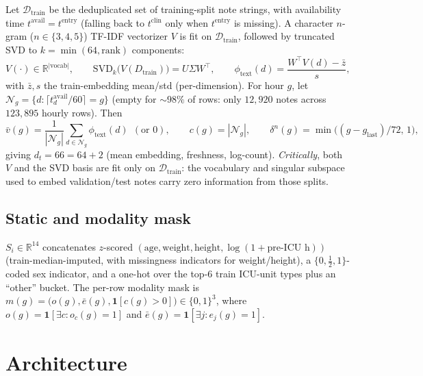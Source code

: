\documentclass[11pt]{article}
\newcommand{\R}{\mathbb{R}}
\newcommand{\1}[1]{\mathbf{1}\!\left[#1\right]}
\begin{document}
Let $\mathcal{D}_{\mathrm{train}}$ be the deduplicated set of training-split note strings, with availability time $t^{\mathrm{avail}} = t^{\mathrm{entry}}$ (falling back to $t^{\mathrm{clin}}$ only when $t^{\mathrm{entry}}$ is missing). A character $n$-gram ($n\in\{3,4,5\}$) TF-IDF vectorizer $V$ is fit on $\mathcal{D}_{\mathrm{train}}$, followed by truncated SVD to $k=\min(64,\mathrm{rank})$ components:
\begin{equation}
V(\cdot) \in \R^{|\mathrm{vocab}|}, \qquad \mathrm{SVD}_k\big(V(D_{\mathrm{train}})\big) = U\Sigma W^\top,\qquad \phi_{\mathrm{text}}(d) = \frac{W^\top V(d) - \bar z}{s},
\end{equation}
with $\bar z, s$ the train-embedding mean/std (per-dimension). For hour $g$, let $\mathcal{N}_g = \{d : \lceil t^{\mathrm{avail}}_d/60\rceil = g\}$ (empty for $\sim98\%$ of rows: only $12{,}920$ notes across $123{,}895$ hourly rows). Then
\begin{equation}
\bar v(g) = \frac{1}{|\mathcal{N}_g|}\sum_{d\in\mathcal{N}_g} \phi_{\mathrm{text}}(d) \ \ (\text{or } 0),\qquad c(g) = |\mathcal{N}_g|,\qquad
\delta^n(g) = \min\big((g - g_{\mathrm{last}})/72,\,1\big),
\end{equation}
giving $d_t = 66 = 64 + 2$ (mean embedding, freshness, log-count). \emph{Critically}, both $V$ and the SVD basis are fit only on $\mathcal{D}_{\mathrm{train}}$: the vocabulary and singular subspace used to embed validation/test notes carry zero information from those splits.

\subsection{Static and modality mask}

$S_i \in \R^{14}$ concatenates $z$-scored $(\mathrm{age},\mathrm{weight},\mathrm{height},\log(1+\text{pre-ICU h}))$ (train-median-imputed, with missingness indicators for weight/height), a $\{0,\tfrac12,1\}$-coded sex indicator, and a one-hot over the top-$6$ train ICU-unit types plus an ``other'' bucket. The per-row modality mask is $m(g) = \big(o(g), \bar e(g), \1{c(g)>0}\big) \in \{0,1\}^3$, where $o(g)=\1{\exists c: o_c(g)=1}$ and $\bar e(g)=\1{\exists j: e_j(g)=1}$.

\section{Architecture}\label{sec:architecture}
\end{document}
